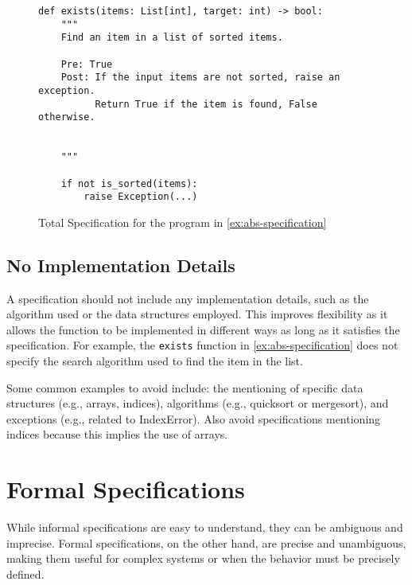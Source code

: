 \documentclass[oneside,11pt,dvipsnames]{book}
\newcommand{\code}[1]{\texttt{#1}}
\begin{document}
\begin{figure}
\begin{lstlisting}
def exists(items: List[int], target: int) -> bool:
    """
    Find an item in a list of sorted items.

    Pre: True
    Post: If the input items are not sorted, raise an exception.
          Return True if the item is found, False otherwise.


    """

    if not is_sorted(items):
        raise Exception(...)
\end{lstlisting}
\caption{Total Specification for the program in \autoref{ex:abs-specification}}\label{ex:abs-total}
\end{figure}



\subsection{No Implementation Details}
A specification should not include any implementation details, such as the algorithm used or the data structures employed. This improves flexibility as it allows the function to be implemented in different ways as long as it satisfies the specification. For example, the \code{exists} function in \autoref{ex:abs-specification} does not specify the search algorithm used to find the item in the list.

Some common examples to avoid include: the mentioning of specific data structures (e.g., arrays, indices), algorithms (e.g., quicksort or mergesort), and exceptions (e.g., related to IndexError). Also avoid specifications mentioning indices because this implies the use of arrays.


\section{Formal Specifications}\label{sec:formal-specs}

While informal specifications are easy to understand, they can be ambiguous and imprecise. Formal specifications, on the other hand, are precise and unambiguous, making them useful for complex systems or when the behavior must be precisely defined.

\end{document}
